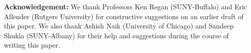 \vspace*{.2in}

\noindent
{\bf Acknowledgement:} We thank
Professors Ken Regan (SUNY-Buffalo) and Eric Allender (Rutgers University)
for constructive suggestions on an earlier draft of this paper.
We also thank Ashish Naik (University of Chicago) and 
Sandeep Shukla (SUNY-Albany) for their help and suggestions during the course
of writing this paper.
\fi
